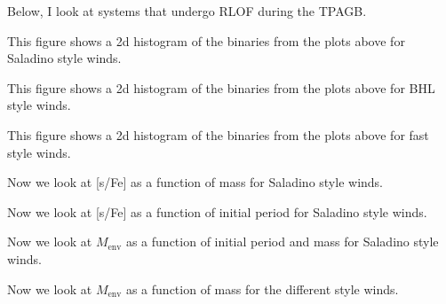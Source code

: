 \documentclass[a4paper,10pt]{article}
\begin{document}
Below, I look at systems that undergo RLOF during the TPAGB.

\begin{figure}[ht]
	\centering
\end{figure}

\begin{figure}[ht]
	\centering
\end{figure}

This figure shows a 2d histogram of the binaries from the plots above for Saladino style winds.
\begin{figure}[ht]
	\centering
\end{figure}

This figure shows a 2d histogram of the binaries from the plots above for BHL style winds.
\begin{figure}[ht]
	\centering
\end{figure}

This figure shows a 2d histogram of the binaries from the plots above for fast style winds.
\begin{figure}[ht]
	\centering
\end{figure}

\nextpage
Now we look at [s/Fe] as a function of mass for Saladino style winds.
\begin{figure}[ht]
	\centering
\end{figure}

Now we look at [s/Fe] as a function of initial period for Saladino style winds.
\begin{figure}[ht]
	\centering
\end{figure}

Now we look at $M_\text{env}$ as a function of initial period and mass for Saladino style winds.
\begin{figure}[ht]
	\centering
\end{figure}

Now we look at $M_\text{env}$ as a function of mass for the different style winds.
\begin{figure}[ht]
	\centering
\end{figure}
\end{document}
